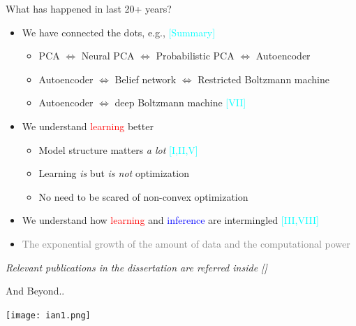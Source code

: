 \documentclass{beamer}
\newcommand{\tred}[1]{\textcolor{red}{#1}}
\newcommand{\tblue}[1]{\textcolor{blue}{#1}}
\begin{document}
\begin{frame}{What has happened in last 20+ years?}
    \begin{itemize}
        \item We have connected the dots, e.g.,
            \textcolor{cyan}{[Summary]}
            \begin{itemize}
                \item PCA $\Leftrightarrow$ Neural PCA
                    $\Leftrightarrow$
                    Probabilistic PCA $\Leftrightarrow$ 
                    Autoencoder
                \item Autoencoder $\Leftrightarrow$ Belief
                    network $\Leftrightarrow$ Restricted
                    Boltzmann machine
                \item Autoencoder $\Leftrightarrow$ deep
                    Boltzmann machine
                    \textcolor{cyan}{[VII]}
            \end{itemize}
        \item We understand \tred{learning} better
            \begin{itemize}
                \item Model structure matters \emph{a lot}
                    \textcolor{cyan}{[I,II,V]}
                \item Learning \emph{is} but \emph{is not} optimization 
                \item No need to be scared of non-convex
                    optimization
            \end{itemize}
        \item We understand how \tred{learning} and
            \tblue{inference} are intermingled
            \textcolor{cyan}{[III,VIII]}
        \item \textcolor{gray}{The exponential growth of the amount of data
            and the computational power}
    \end{itemize}

    \begin{flushright}
        {\it \scriptsize \color{cyan} Relevant publications in the dissertation
    are referred inside []}
    \end{flushright}
\end{frame}


\begin{frame}{And Beyond..}

    \hspace*{-10.5mm}
    \texttt{[image: ian1.png]}

    
\end{frame}
\end{document}
